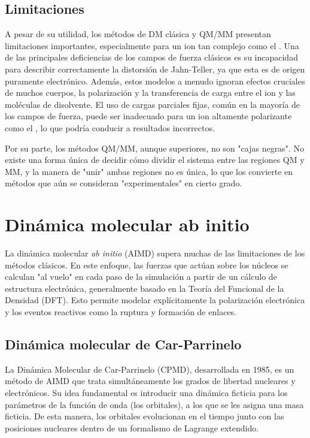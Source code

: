 \subsection{Limitaciones}
A pesar de su utilidad, los métodos de DM clásica y QM/MM presentan limitaciones importantes, especialmente para un ion tan complejo como el . Una de las principales deficiencias de los campos de fuerza clásicos es su incapacidad para describir correctamente la distorsión de Jahn-Teller, ya que esta es de origen puramente electrónico. Además, estos modelos a menudo ignoran efectos cruciales de muchos cuerpos, la polarización y la transferencia de carga entre el ion y las moléculas de disolvente. El uso de cargas parciales fijas, común en la mayoría de los campos de fuerza, puede ser inadecuado para un ion altamente polarizante como el , lo que podría conducir a resultados incorrectos.

Por su parte, los métodos QM/MM, aunque superiores, no son "cajas negras". No existe una forma única de decidir cómo dividir el sistema entre las regiones QM y MM, y la manera de "unir" ambas regiones no es única, lo que los convierte en métodos que aún se consideran "experimentales" en cierto grado.

\section{Dinámica molecular ab initio}

La dinámica molecular \textit{ab initio} (AIMD) supera muchas de las limitaciones de los métodos clásicos. En este enfoque, las fuerzas que actúan sobre los núcleos se calculan "al vuelo" en cada paso de la simulación a partir de un cálculo de estructura electrónica, generalmente basado en la Teoría del Funcional de la Densidad (DFT). Esto permite modelar explícitamente la polarización electrónica y los eventos reactivos como la ruptura y formación de enlaces.

\subsection{Dinámica molecular de Car-Parrinelo}

La Dinámica Molecular de Car-Parrinelo (CPMD), desarrollada en 1985, es un método de AIMD que trata simultáneamente los grados de libertad nucleares y electrónicos. Su idea fundamental es introducir una dinámica ficticia para los parámetros de la función de onda (los orbitales), a los que se les asigna una masa ficticia. De esta manera, los orbitales evolucionan en el tiempo junto con las posiciones nucleares dentro de un formalismo de Lagrange extendido.

